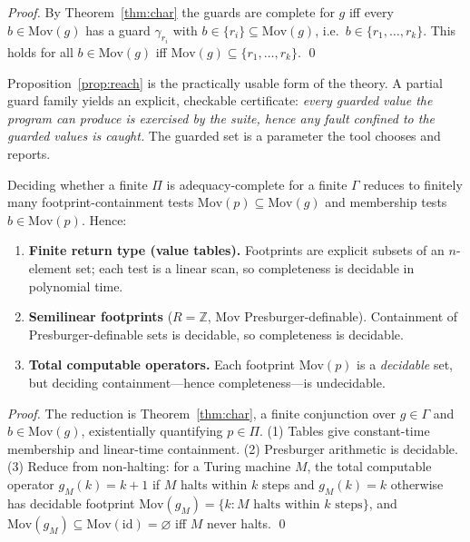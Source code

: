 \documentclass[runningheads,envcountsect,envcountsame]{llncs}
\newcommand{\Mov}{\mathrm{Mov}}
\begin{document}
\begin{proof}
By Theorem~\ref{thm:char} the guards are complete for $g$ iff every
$b \in \Mov(g)$ has a guard $\gamma_{r_i}$ with $b \in \{r_i\} \subseteq \Mov(g)$,
i.e.\ $b \in \{r_1,\dots,r_k\}$. This holds for all $b \in \Mov(g)$ iff
$\Mov(g) \subseteq \{r_1,\dots,r_k\}$. \qed
\end{proof}

Proposition~\ref{prop:reach} is the practically usable form of the theory. A
partial guard family yields an explicit, checkable certificate: \emph{every
guarded value the program can produce is exercised by the suite, hence any fault
confined to the guarded values is caught.} The guarded set is a parameter the
tool chooses and reports.

\begin{theorem}
\label{thm:decide}
Deciding whether a finite $\Pi$ is adequacy-complete for a finite $\Gamma$
reduces to finitely many footprint-containment tests
$\Mov(p) \subseteq \Mov(g)$ and membership tests $b \in \Mov(p)$. Hence:
\begin{enumerate}
\item \textbf{Finite return type (value tables).} Footprints are explicit subsets
of an $n$-element set; each test is a linear scan, so completeness is decidable
in polynomial time.
\item \textbf{Semilinear footprints} ($R = \mathbb{Z}$, $\Mov$
Presburger-definable). Containment of Presburger-definable sets is decidable, so
completeness is decidable.
\item \textbf{Total computable operators.} Each footprint $\Mov(p)$ is a
\emph{decidable} set, but deciding containment---hence completeness---is
undecidable.
\end{enumerate}
\end{theorem}

\begin{proof}
The reduction is Theorem~\ref{thm:char}, a finite conjunction over $g \in \Gamma$
and $b \in \Mov(g)$, existentially quantifying $p \in \Pi$. (1) Tables give
constant-time membership and linear-time containment. (2) Presburger arithmetic
is decidable. (3) Reduce from non-halting: for a Turing machine $M$, the total
computable operator $g_M(k) = k+1$ if $M$ halts within $k$ steps and
$g_M(k) = k$ otherwise has decidable footprint
$\Mov(g_M) = \{k : M \text{ halts within } k \text{ steps}\}$, and
$\Mov(g_M) \subseteq \Mov(\mathrm{id}) = \varnothing$ iff $M$ never halts. \qed
\end{proof}
\end{document}
